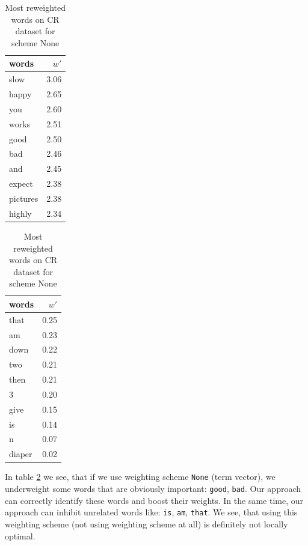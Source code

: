 \begin{table}[H]
    \centering
    \begin{minipage}{.4\linewidth}
      \centering
        \begin{tabular}{lr}
\toprule
    words &  $w'$ \\
\midrule
     slow &  3.06 \\
    happy &  2.65 \\
      you &  2.60 \\
    works &  2.51 \\
     good &  2.50 \\
      bad &  2.46 \\
      and &  2.45 \\
   expect &  2.38 \\
 pictures &  2.38 \\
   highly &  2.34 \\
\bottomrule
\end{tabular}

    \end{minipage}
    \begin{minipage}{.4\linewidth}
      \centering
        \begin{tabular}{lr}
\toprule
  words &  $w'$ \\
\midrule
   that &  0.25 \\
     am &  0.23 \\
   down &  0.22 \\
    two &  0.21 \\
   then &  0.21 \\
      3 &  0.20 \\
   give &  0.15 \\
     is &  0.14 \\
      n &  0.07 \\
 diaper &  0.02 \\
\bottomrule
\end{tabular}

    \end{minipage} 
    \caption{Most reweighted words on CR dataset for scheme None}
    \label{tab:words:CR:None}
\end{table}

    In table \ref{tab:words:CR:None} we see, that if we use weighting scheme \texttt{None} (term vector), 
    we underweight some words that are obviously important: \texttt{good}, \texttt{bad}.
    Our approach can correctly identify these words and boost their weights.
    In the same time, our approach can inhibit unrelated words like: \texttt{is}, \texttt{am}, \texttt{that}.
    We see, that using this weighting scheme (not using weighting scheme at all) is definitely not locally optimal.
    
